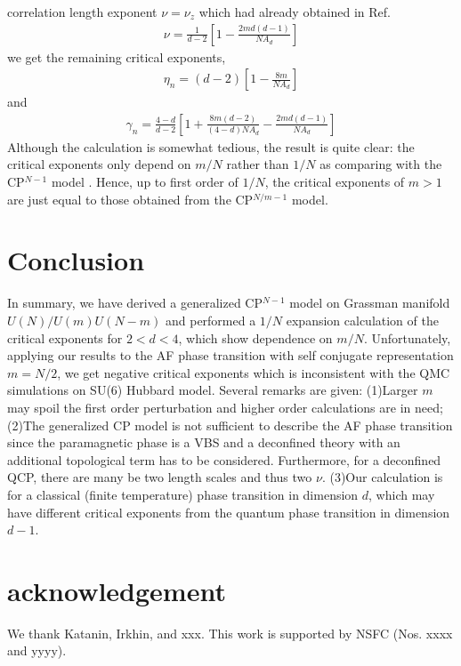 \documentclass[aps,twocolumn,superscriptaddress]{revtex4-1}
\newcommand{\bea}{\begin{eqnarray}}
\newcommand{\eea}{\end{eqnarray}}
\begin{document}
correlation length exponent $\nu=\nu_z$ which had already obtained in Ref.~\cite{hikami1980} \bea
\nu=\frac{1}{d-2}\left[ 1-\frac{2md(d-1)}{NA_d} \right] \eea we get the remaining critical exponents, \bea
\eta_n=(d-2)\left[1-\frac{8m}{NA_d}\right] \eea and \bea \gamma_n=\frac{4-d}{d-2}\left[
1+\frac{8m(d-2)}{(4-d)NA_d}-\frac{2md(d-1)}{NA_d} \right] \eea Although the calculation is somewhat tedious, the
result is quite clear: the critical exponents only depend on $m/N$ rather than $1/N$ as comparing with the
CP$^{N-1}$ model \cite{irkhin1996}. Hence, up to first order of $1/N$, the critical exponents of $m>1$ are just
equal to those obtained from the CP$^{N/m-1}$ model. 

\section{Conclusion}
In summary, we have derived a generalized CP$^{N-1}$ model on Grassman manifold $U(N)/U(m)U(N-m)$ and performed a $1/N$
expansion calculation of the critical exponents for $2<d<4$, which show dependence on $m/N$. Unfortunately, applying our
results to the AF phase transition with self conjugate representation $m=N/2$, we get negative critical exponents which
is inconsistent with the QMC simulations on SU(6) Hubbard model. Several remarks are given: (1)Larger $m$ may spoil the
first order perturbation and higher order calculations are in need; (2)The generalized CP model is not sufficient to
describe the AF phase transition since the paramagnetic phase is a VBS and a deconfined theory with an additional
topological term has to be considered. \cite{senthil2004} Furthermore, for a deconfined QCP, there are many be two
length scales and thus two $\nu$. \cite{Shao2016} (3)Our calculation is for a classical (finite temperature) phase
transition in dimension $d$, which may have different critical exponents from the quantum phase transition in dimension
$d-1$. \cite{sondhi1997}


\section{acknowledgement}
We thank Katanin, Irkhin, and xxx. This work is supported by NSFC (Nos. xxxx and yyyy).



\end{document}
